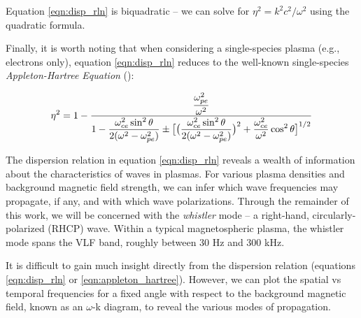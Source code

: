 Equation \ref{eqn:disp_rln} is biquadratic -- we can solve for $\eta^2 = k^2c^2/\omega^2$ using the quadratic formula.

Finally, it is worth noting that when considering a single-species plasma (e.g., electrons only), equation \ref{eqn:disp_rln} reduces to the well-known single-species \emph{Appleton-Hartree Equation} (\cite{Appleton1932}):


\begin{equation}
\eta^2 = 1 - \frac{\displaystyle \frac{\omega_{pe}^2}{\omega^2}}{\displaystyle 1 - \frac{\omega_{ce}^2\sin^2\theta}{2(\omega^2 - \omega_{pe}^2)} \pm\big[\big(\frac{\omega_{ce}^2\sin^2\theta}{2(\omega^2 - \omega_{pe}^2)}\big)^2 + \frac{\omega_{ce}^2}{\omega^2}\cos^2\theta\big]^{1/2}}
\label{eqn:appleton_hartree}
\end{equation}


The dispersion relation in equation \ref{eqn:disp_rln} reveals a wealth of information about the characteristics of waves in plasmas. For various plasma densities and background magnetic field strength, we can infer which wave frequencies may propagate, if any, and with which wave polarizations. Through the remainder of this work, we will be concerned with the \emph{whistler} mode -- a right-hand, circularly-polarized (RHCP) wave. Within a typical magnetospheric plasma, the whistler mode spans the VLF band, roughly between 30 Hz and 300 kHz.

It is difficult to gain much insight directly from the dispersion relation (equations \ref{eqn:disp_rln} or \ref{eqn:appleton_hartree}). However, we can plot the spatial vs temporal frequencies for a fixed angle with respect to the background magnetic field, known as an $\omega$-k diagram, to reveal the various modes of propagation.


